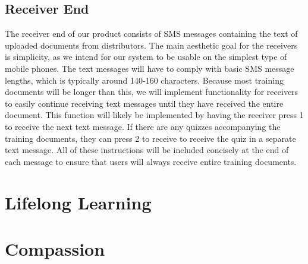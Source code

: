 \subsection*{Receiver End}

The receiver end of our product consists of SMS messages containing the text of uploaded documents from distributors. The main aesthetic goal for the receivers is simplicity, as we intend for our system to be usable on the simplest type of mobile phones. The text messages will have to comply with basic SMS message lengths, which is typically around 140-160 characters. Because most training documents will be longer than this, we will implement functionality for receivers to easily continue receiving text messages until they have received the entire document. This function will likely be implemented by having the receiver press 1 to receive the next text message. If there are any quizzes accompanying the training documents, they can press 2 to receive to receive the quiz in a separate text message. All of these instructions will be included concisely at the end of each message to ensure that users will always receive entire training documents.


\section*{Lifelong Learning}

\section*{Compassion}